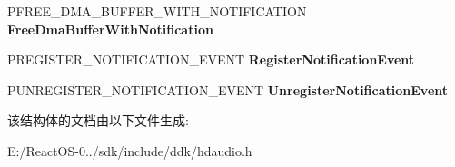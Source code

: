 \begin{DoxyCompactItemize}
\item 
\mbox{\label{struct___h_d_a_u_d_i_o___b_u_s___i_n_t_e_r_f_a_c_e___v2_ad7384f1205d1bb224b990f546e4f7ba8}} 
P\+F\+R\+E\+E\+\_\+\+D\+M\+A\+\_\+\+B\+U\+F\+F\+E\+R\+\_\+\+W\+I\+T\+H\+\_\+\+N\+O\+T\+I\+F\+I\+C\+A\+T\+I\+ON {\bfseries Free\+Dma\+Buffer\+With\+Notification}
\item 
\mbox{\label{struct___h_d_a_u_d_i_o___b_u_s___i_n_t_e_r_f_a_c_e___v2_ab3cada29ff2cd20bb1b0c53e7f57b279}} 
P\+R\+E\+G\+I\+S\+T\+E\+R\+\_\+\+N\+O\+T\+I\+F\+I\+C\+A\+T\+I\+O\+N\+\_\+\+E\+V\+E\+NT {\bfseries Register\+Notification\+Event}
\item 
\mbox{\label{struct___h_d_a_u_d_i_o___b_u_s___i_n_t_e_r_f_a_c_e___v2_a806365e8bcc816c166391b42f93d2146}} 
P\+U\+N\+R\+E\+G\+I\+S\+T\+E\+R\+\_\+\+N\+O\+T\+I\+F\+I\+C\+A\+T\+I\+O\+N\+\_\+\+E\+V\+E\+NT {\bfseries Unregister\+Notification\+Event}
\end{DoxyCompactItemize}


该结构体的文档由以下文件生成\+:\begin{DoxyCompactItemize}
\item 
E\+:/\+React\+O\+S-\/0../sdk/include/ddk/hdaudio.\+h\end{DoxyCompactItemize}
